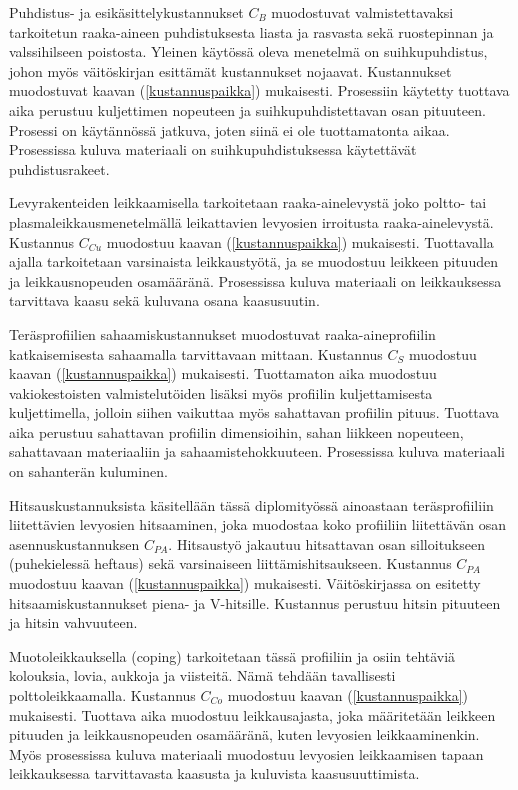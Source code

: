 \documentclass[12pt]{article}
\newenvironment{content}{\pagenumbering{arabic}}{}
\begin{document}
\begin{content}
Puhdistus- ja esikäsittelykustannukset $C_B$ muodostuvat valmistettavaksi tarkoitetun raaka-aineen puhdistuksesta liasta ja rasvasta sekä ruostepinnan ja valssihilseen poistosta. Yleinen käytössä oleva menetelmä on suihkupuhdistus, johon myös väitöskirjan esittämät kustannukset nojaavat. Kustannukset muodostuvat kaavan (\ref{kustannuspaikka}) mukaisesti. Prosessiin käytetty tuottava aika perustuu kuljettimen nopeuteen ja suihkupuhdistettavan osan pituuteen. Prosessi on käytännössä jatkuva, joten siinä ei ole tuottamatonta aikaa. Prosessissa kuluva materiaali on suihkupuhdistuksessa käytettävät puhdistusrakeet. 

Levyrakenteiden leikkaamisella tarkoitetaan raaka-ainelevystä joko poltto- tai plasmaleikkausmenetelmällä leikattavien levyosien irroitusta raaka-ainelevystä. Kustannus $C_{Cu}$ muodostuu kaavan (\ref{kustannuspaikka}) mukaisesti. Tuottavalla ajalla tarkoitetaan varsinaista leikkaustyötä, ja se muodostuu leikkeen pituuden ja leikkausnopeuden osamääränä. Prosessissa kuluva materiaali on leikkauksessa tarvittava kaasu sekä kuluvana osana kaasusuutin. 

Teräsprofiilien sahaamiskustannukset muodostuvat raaka-aineprofiilin katkaisemisesta sahaamalla tarvittavaan mittaan. Kustannus $C_S$ muodostuu kaavan (\ref{kustannuspaikka}) mukaisesti. Tuottamaton aika muodostuu vakiokestoisten valmistelutöiden lisäksi myös profiilin kuljettamisesta kuljettimella, jolloin siihen vaikuttaa myös sahattavan profiilin pituus. Tuottava aika perustuu sahattavan profiilin dimensioihin, sahan liikkeen nopeuteen, sahattavaan materiaaliin ja sahaamistehokkuuteen. Prosessissa kuluva materiaali on sahanterän kuluminen. 

Hitsauskustannuksista käsitellään tässä diplomityössä ainoastaan teräsprofiiliin liitettävien levyosien hitsaaminen, joka muodostaa koko profiiliin liitettävän osan asennuskustannuksen $C_{PA}$. Hitsaustyö jakautuu hitsattavan osan silloitukseen (puhekielessä heftaus) sekä varsinaiseen liittämishitsaukseen. Kustannus $C_{PA}$ muodostuu kaavan (\ref{kustannuspaikka}) mukaisesti. Väitöskirjassa on esitetty hitsaamiskustannukset piena- ja V-hitsille. Kustannus perustuu hitsin pituuteen ja hitsin vahvuuteen. 

Muotoleikkauksella (coping) tarkoitetaan tässä profiiliin ja osiin tehtäviä kolouksia, lovia, aukkoja ja viisteitä. Nämä tehdään tavallisesti polttoleikkaamalla. Kustannus $C_{Co}$ muodostuu kaavan (\ref{kustannuspaikka}) mukaisesti. Tuottava aika muodostuu leikkausajasta, joka määritetään leikkeen pituuden ja leikkausnopeuden osamääränä, kuten levyosien leikkaaminenkin. Myös prosessissa kuluva materiaali muodostuu levyosien leikkaamisen tapaan leikkauksessa tarvittavasta kaasusta ja kuluvista kaasusuuttimista. 


\end{content}
\end{document}
